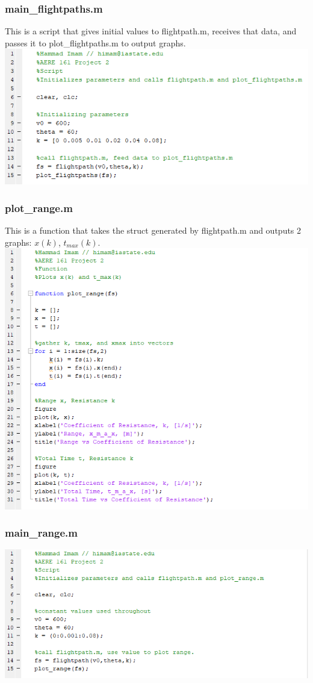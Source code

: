 \documentclass[oneside]{article}
\begin{document}
\subsubsection{main\_flightpaths.m}
This is a script that gives initial values to flightpath.m, receives that data, and passes it to plot\_flightpaths.m to output graphs.\\
\includegraphics [width=\linewidth]{code_main_flightpaths.png}
\subsubsection{plot\_range.m}
This is a function that takes the struct generated by flightpath.m and outputs 2 graphs: $x(k)$, $t_{max}(k)$.\\
\includegraphics [width=\linewidth]{code_plot_range.png}
\subsubsection{main\_range.m}
\includegraphics [width=\linewidth]{code_main_range.png}
\newpage
\end{document}
